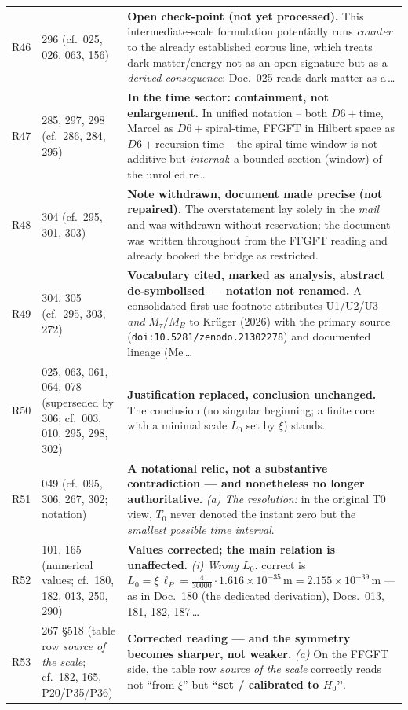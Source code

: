 \begin{longtable}{@{}p{0.9cm}p{3.1cm}p{10.2cm}@{}}
R46 & 296 (cf.\ 025, 026, 063, 156) & \textbf{Open check-point (not yet processed).} This intermediate-scale formulation potentially runs \emph{counter} to the already established corpus line, which treats dark matter/energy not as an open signature but as a \emph{derived consequence}: Doc.~025 reads dark matter as a\,\ldots \\
R47 & 285, 297, 298 (cf.\ 286, 284, 295) & \textbf{In the time sector: containment, not enlargement.} In unified notation -- both $D6+$time, Marcel as $D6+$spiral-time, FFGFT in Hilbert space as $D6+$recursion-time -- the spiral-time window is not additive but \emph{internal}: a bounded section (window) of the unrolled re\,\ldots \\
R48 & 304 (cf.\ 295, 301, 303) & \textbf{Note withdrawn, document made precise (not repaired).} The overstatement lay solely in the \emph{mail} and was withdrawn without reservation; the document was written throughout from the FFGFT reading and already booked the bridge as restricted. \\
R49 & 304, 305 (cf.\ 295, 303, 272) & \textbf{Vocabulary cited, marked as analysis, abstract de-symbolised --- notation not renamed.} A consolidated first-use footnote attributes U1/U2/U3 \emph{and} $M_\tau/M_B$ to Krüger (2026) with the primary source (\texttt{doi:10.5281/zenodo.21302278}) and documented lineage (Me\,\ldots \\
R50 & 025, 063, 061, 064, 078 (superseded by 306; cf.\ 003, 010, 295, 298, 302) & \textbf{Justification replaced, conclusion unchanged.} The conclusion (no singular beginning; a finite core with a minimal scale $L_0$ set by $\xi$) stands. \\
R51 & 049 (cf.\ 095, 306, 267, 302; notation) & \textbf{A notational relic, not a substantive contradiction --- and nonetheless no longer authoritative.} \emph{(a) The resolution:} in the original T0 view, $T_0$ never denoted the instant zero but the \emph{smallest possible time interval}. \\
R52 & 101, 165 (numerical values; cf.\ 180, 182, 013, 250, 290) & \textbf{Values corrected; the main relation is unaffected.} \emph{(i) Wrong $L_0$:} correct is $L_0 = \xi\,\ell_P = \tfrac{4}{30000}\cdot 1.616\times10^{-35}\,\text{m} = \boxed{2.155\times10^{-39}\,\text{m}}$ --- as in Doc.~180 (the dedicated derivation), Docs.~013, 181, 182, 187\,\ldots \\
R53 & 267 \S518 (table row \emph{source of the scale}; cf.\ 182, 165, P20/P35/P36) & \textbf{Corrected reading --- and the symmetry becomes sharper, not weaker.} \emph{(a)} On the FFGFT side, the table row \emph{source of the scale} correctly reads not \enquote{from $\xi$} but \textbf{\enquote{set / calibrated to $H_0$}}. \\

\end{longtable}
